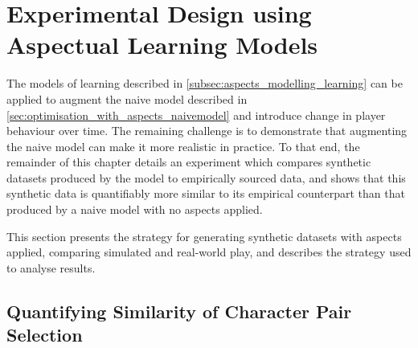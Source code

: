 \section{Experimental Design using Aspectual Learning Models}
\label{sec:optimisation_with_aspects_experimental_design}


The models of learning described in \cref{subsec:aspects_modelling_learning} can
be applied to augment the naive model described in
\cref{sec:optimisation_with_aspects_naivemodel} and introduce change in player
behaviour over time. The remaining challenge is to demonstrate that augmenting
the naive model can make it more realistic in practice. To that end, the
remainder of this chapter details an experiment which compares synthetic
datasets produced by the model to empirically sourced data, and shows that this
synthetic data is quantifiably more similar to its empirical counterpart than
that produced by a naive model with no aspects applied.

This section presents the strategy for generating synthetic datasets with
aspects applied, comparing simulated and real-world play, and describes the
strategy used to analyse results.

\subsection{Quantifying Similarity of Character Pair Selection}


